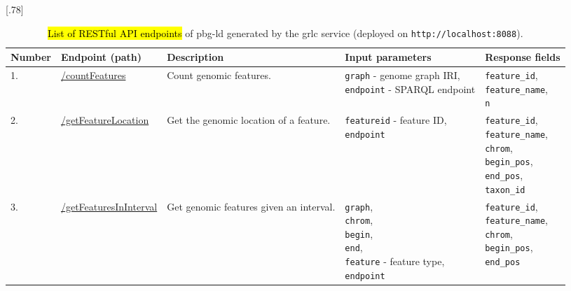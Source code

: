 \documentclass[applsci,article,accept,moreauthors,pdftex]{Definitions/mdpi}
\begin{document}
{\begin{table}[H]
\centering
\caption{\hl{List of RESTful API endpoints} %
 of pbg-ld generated by the grlc service (deployed on \texttt{http://localhost:8088}).} %
\label{SP:Table1}
\scalebox{.78}[.78]{\begin{tabular}{m{1.2cm}<{\raggedright}m{3cm}<{\raggedright}m{3.5cm}<{\raggedright}m{4.5cm}<{\raggedright}m{3cm}<{\raggedright}}
\toprule
\textbf{Number} & \textbf{Endpoint (path)} & \textbf{Description} & \textbf{Input parameters} & \textbf{Response fields} \\
\midrule
1. & \href{http://localhost:8088/api-local/\#/Count\%20genomic\%20features/get_countFeatures}{/countFeatures}
& Count genomic features.
& \makecell[l]{\texttt{graph} - genome graph IRI,\\ \texttt{endpoint} - SPARQL endpoint} & \makecell[l]{\texttt{feature\_id},\\ \texttt{feature\_name},\\ \texttt{n}}\\

2. & \href{http://localhost:8088/api-local/\#/Get\%20the\%20genomic\%20location\%20of\%20a\%20feature/get_getFeatureLocation}{/getFeatureLocation}
& Get the genomic location of a feature.
& \makecell[l]{\texttt{featureid} - feature ID,\\ \texttt{endpoint}}
& \makecell[l]{\texttt{feature\_id},\\ \texttt{feature\_name},\\ \texttt{chrom},\\ \texttt{begin\_pos},\\ \texttt{end\_pos},\\ \texttt{taxon\_id}}\\

3. & \href{http://localhost:8088/api-local/\#/Get\%20genomic\%20features\%20given\%20an\%20interval/get_getFeaturesInInterval}{/getFeaturesInInterval}
& Get genomic features given an interval.
& \makecell[l]{\texttt{graph},\\ \texttt{chrom},\\ \texttt{begin},\\ \texttt{end},\\ \texttt{feature} - feature type,\\ \texttt{endpoint}}
& \makecell[l]{\texttt{feature\_id},\\ \texttt{feature\_name},\\ \texttt{chrom},\\ \texttt{begin\_pos},\\ \texttt{end\_pos}}\\


\end{tabular}}
\end{table}}
\end{document}
